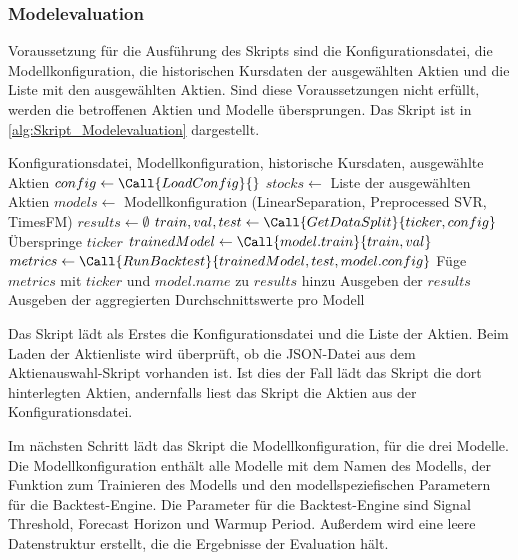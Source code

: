 \subsubsection{Modelevaluation}
Voraussetzung für die Ausführung des Skripts sind die Konfigurationsdatei, die Modellkonfiguration, die historischen Kursdaten der ausgewählten Aktien und die Liste mit den ausgewählten Aktien. Sind diese Voraussetzungen nicht erfüllt, werden die betroffenen Aktien und Modelle übersprungen. Das Skript ist in \cref{alg:Skript_Modelevaluation} dargestellt.
\begin{algorithm}
    \caption{Skript Modelevaluation}\label{alg:Skript_Modelevaluation}
    \small
    \begin{algorithmic}[1]
        \Require Konfigurationsdatei, Modellkonfiguration, historische Kursdaten, ausgewählte Aktien
        \State $config \gets \Call{LoadConfig}{}$
        \State $stocks \gets$ Liste der ausgewählten Aktien
        \State $models \gets$ Modellkonfiguration (LinearSeparation, Preprocessed SVR, TimesFM)
        \State $results \gets \emptyset$
        \State $train, val, test \gets \Call{GetDataSplit}{ticker, config}$ 
        \State Überspringe $ticker$
        \EndIf
        \State $trainedModel \gets \Call{model.train}{train, val}$
        \State $metrics \gets \Call{RunBacktest}{trainedModel, test, model.config}$
        \State Füge $metrics$ mit $ticker$ und $model.name$ zu $results$ hinzu
        \EndFor
        \EndFor
        \State Ausgeben der $results$
        \State Ausgeben der aggregierten Durchschnittswerte pro Modell
    \end{algorithmic}
\end{algorithm}
Das Skript lädt als Erstes die Konfigurationsdatei und die Liste der Aktien. Beim Laden der Aktienliste wird überprüft, ob die JSON-Datei aus dem Aktienauswahl-Skript vorhanden ist. Ist dies der Fall lädt das Skript die dort hinterlegten Aktien, andernfalls liest das Skript die Aktien aus der Konfigurationsdatei.

Im nächsten Schritt lädt das Skript die Modellkonfiguration, für die drei Modelle. Die Modellkonfiguration enthält alle Modelle mit dem Namen des Modells, der Funktion zum Trainieren des Modells und den modellspeziefischen Parametern für die Backtest-Engine. Die Parameter für die Backtest-Engine sind Signal Threshold, Forecast Horizon und Warmup Period. Außerdem wird eine leere Datenstruktur erstellt, die die Ergebnisse der Evaluation hält.


